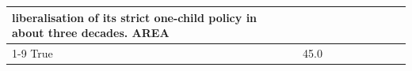 \begin{table}[H]
\begin{tabular}{lllrlllll}
liberalisation of its strict one-child policy in about three decades. AREA \\
\cline{1-9}
True & 45.0%
\end{tabular}
\end{table}

